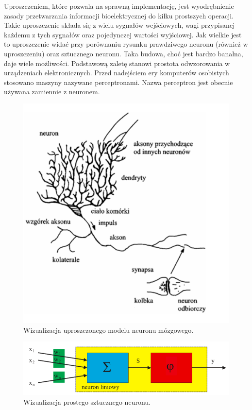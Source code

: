 \documentclass[12pt,a4paper,twoside,titlepage,openright]{book}
\begin{document}
Uproszczeniem, które pozwala na sprawną implementację, jest wyodrębnienie zasady przetwarzania informacji bioelektrycznej do kilku prostszych operacji. Takie uproszczenie składa się z wielu sygnałów wejściowych, wagi przypisanej każdemu z tych sygnałów oraz pojedynczej wartości wyjściowej. Jak wielkie jest to uproszczenie widać przy porównaniu rysunku prawdziwego neuronu (również w uproszczeniu) oraz sztucznego neuronu. Taka budowa, choć jest bardzo banalna, daje wiele możliwości. Podstawową zaletę stanowi prostota odwzorowania w urządzeniach elektronicznych. Przed nadejściem ery komputerów osobistych stosowano maszyny nazywane perceptronami. Nazwa perceptron jest obecnie używana zamiennie z neuronem.\cite{odkrywanieSieci}

\begin{figure}[ht]
	\centering
			\includegraphics[resolution=100, scale=0.7]{neuronMozgowy.png}
		\caption{Wizualizacja uproszczonego modelu neuronu mózgowego.}
\end{figure}

\begin{figure}[ht]
	\centering
			\includegraphics[resolution=100, scale=0.68]{sztucznyNeuron.png}
		\caption{Wizualizacja prostego sztucznego neuronu.}
\end{figure}
\end{document}
